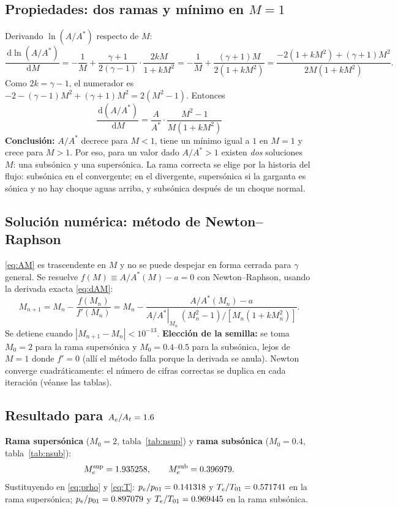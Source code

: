 \documentclass[11pt,a4paper]{article}
\newcommand{\As}{A^{*}}
\newcommand{\dd}{\,\mathrm{d}}
\begin{document}
\subsection{Propiedades: dos ramas y mínimo en $M=1$}
Derivando $\ln(A/\As)$ respecto de $M$:
\[
\frac{\dd\ln(A/\As)}{\dd M}=-\frac{1}{M}+\frac{\gamma+1}{2(\gamma-1)}\cdot\frac{2kM}{1+kM^2}
=-\frac1M+\frac{(\gamma+1)M}{2(1+kM^2)}
=\frac{-2(1+kM^2)+(\gamma+1)M^2}{2M(1+kM^2)}.
\]
Como $2k=\gamma-1$, el numerador es $-2-(\gamma-1)M^2+(\gamma+1)M^2=2(M^2-1)$. Entonces
\begin{equation}
\boxed{\frac{\dd(A/\As)}{\dd M}=\frac{A}{\As}\cdot\frac{M^2-1}{M\left(1+kM^2\right)}}\label{eq:dAM}
\end{equation}
\textbf{Conclusión:} $A/\As$ decrece para $M<1$, tiene un mínimo igual a $1$ en $M=1$ y crece para $M>1$. Por eso, para un valor dado
$A/\As>1$ existen \emph{dos} soluciones $M$: una subsónica y una supersónica. La rama correcta se elige por la historia del flujo:
subsónica en el convergente; en el divergente, supersónica si la garganta es sónica y no hay choque aguas arriba,
y subsónica después de un choque normal.

\subsection{Solución numérica: método de Newton--Raphson}
\eqref{eq:AM} es trascendente en $M$ y no se puede despejar en forma cerrada para $\gamma$ general. Se resuelve
$f(M)\equiv A/\As(M)-a=0$ con Newton--Raphson, usando la derivada exacta \eqref{eq:dAM}:
\[
M_{n+1}=M_n-\frac{f(M_n)}{f'(M_n)}=M_n-\frac{A/\As(M_n)-a}{\left.A/\As\right|_{M_n}\,(M_n^2-1)/[M_n(1+kM_n^2)]}.
\]
Se detiene cuando $|M_{n+1}-M_n|<10^{-13}$. \textbf{Elección de la semilla:} se toma $M_0=2$ para la rama supersónica y $M_0=0.4$--$0.5$ para la
subsónica, lejos de $M=1$ donde $f'=0$ (allí el método falla porque la derivada se anula).
Newton converge cuadráticamente: el número de cifras correctas se duplica en cada iteración (véanse las tablas).

\subsection{Resultado para $A_e/A_t=1.6$}
\textbf{Rama supersónica} ($M_0=2$, tabla~\ref{tab:nsup}) y \textbf{rama subsónica} ($M_0=0.4$, tabla~\ref{tab:nsub}):
\[
M_e^{\rm sup}=1.935258,\qquad M_e^{\rm sub}=0.396979 .
\]
Sustituyendo en \eqref{eq:prho} y \eqref{eq:T}: $p_e/p_{01}=0.141318$ y $T_e/T_{01}=0.571741$ en la rama supersónica;
$p_e/p_{01}=0.897079$ y $T_e/T_{01}=0.969445$ en la rama subsónica.
\end{document}
